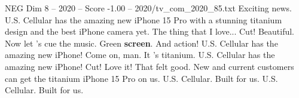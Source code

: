 \begin{textsample}{NEG Dim 8 – 2020 – Score -1.00 – 2020/tv\_com\_2020\_85.txt}  \label{ex:f8_neg_079}
Exciting news.
U.S.
Cellular has the amazing new iPhone 15 Pro with a stunning titanium design and the best iPhone camera yet.
The thing that I love...
Cut!
Beautiful.
Now let 's cue the music.
Green \textbf{screen}.
And action!
U.S.
Cellular has the amazing new iPhone!
Come on, man.
It 's titanium.
U.S.
Cellular has the amazing new iPhone!
Cut!
Love it!
That felt good.
New and current customers can get the titanium iPhone 15 Pro on us.
U.S.
Cellular.
Built for us.
U.S.
Cellular.
Built for us.

\end{textsample}
